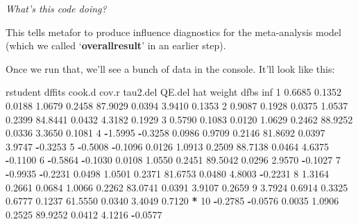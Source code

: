\documentclass[
]{book}
\newenvironment{Shaded}{\begin{snugshade}}{\end{snugshade}}
\newcommand{\DecValTok}[1]{\textcolor[rgb]{0.00,0.00,0.81}{#1}}
\newcommand{\FloatTok}[1]{\textcolor[rgb]{0.00,0.00,0.81}{#1}}
\newcommand{\NormalTok}[1]{#1}
\newcommand{\SpecialCharTok}[1]{\textcolor[rgb]{0.81,0.36,0.00}{\textbf{#1}}}
\begin{document}
\emph{What's this code doing?}

This tells metafor to produce influence diagnostics for the meta-analysis model (which we called `\textbf{overallresult}' in an earlier step).

Once we run that, we'll see a bunch of data in the console. It'll look like this:

\begin{Shaded}
\begin{Highlighting}[]
\NormalTok{  rstudent  dffits cook.d  cov.r tau2.del  QE.del    hat weight    dfbs inf }
\DecValTok{1}    \FloatTok{0.6685}  \FloatTok{0.1352} \FloatTok{0.0188} \FloatTok{1.0679}   \FloatTok{0.2458} \FloatTok{87.9029} \FloatTok{0.0394} \FloatTok{3.9410}  \FloatTok{0.1353}     
\DecValTok{2}    \FloatTok{0.9087}  \FloatTok{0.1928} \FloatTok{0.0375} \FloatTok{1.0537}   \FloatTok{0.2399} \FloatTok{84.8441} \FloatTok{0.0432} \FloatTok{4.3182}  \FloatTok{0.1929}     
\DecValTok{3}    \FloatTok{0.5790}  \FloatTok{0.1083} \FloatTok{0.0120} \FloatTok{1.0629}   \FloatTok{0.2462} \FloatTok{88.9252} \FloatTok{0.0336} \FloatTok{3.3650}  \FloatTok{0.1081}     
\DecValTok{4}   \SpecialCharTok{{-}}\FloatTok{1.5995} \SpecialCharTok{{-}}\FloatTok{0.3258} \FloatTok{0.0986} \FloatTok{0.9709}   \FloatTok{0.2146} \FloatTok{81.8692} \FloatTok{0.0397} \FloatTok{3.9747} \SpecialCharTok{{-}}\FloatTok{0.3253}     
\DecValTok{5}   \SpecialCharTok{{-}}\FloatTok{0.5008} \SpecialCharTok{{-}}\FloatTok{0.1096} \FloatTok{0.0126} \FloatTok{1.0913}   \FloatTok{0.2509} \FloatTok{88.7138} \FloatTok{0.0464} \FloatTok{4.6375} \SpecialCharTok{{-}}\FloatTok{0.1100}     
\DecValTok{6}   \SpecialCharTok{{-}}\FloatTok{0.5864} \SpecialCharTok{{-}}\FloatTok{0.1030} \FloatTok{0.0108} \FloatTok{1.0550}   \FloatTok{0.2451} \FloatTok{89.5042} \FloatTok{0.0296} \FloatTok{2.9570} \SpecialCharTok{{-}}\FloatTok{0.1027}     
\DecValTok{7}   \SpecialCharTok{{-}}\FloatTok{0.9935} \SpecialCharTok{{-}}\FloatTok{0.2231} \FloatTok{0.0498} \FloatTok{1.0501}   \FloatTok{0.2371} \FloatTok{81.6753} \FloatTok{0.0480} \FloatTok{4.8003} \SpecialCharTok{{-}}\FloatTok{0.2231}     
\DecValTok{8}    \FloatTok{1.3164}  \FloatTok{0.2661} \FloatTok{0.0684} \FloatTok{1.0066}   \FloatTok{0.2262} \FloatTok{83.0741} \FloatTok{0.0391} \FloatTok{3.9107}  \FloatTok{0.2659}     
\DecValTok{9}    \FloatTok{3.7924}  \FloatTok{0.6914} \FloatTok{0.3325} \FloatTok{0.6777}   \FloatTok{0.1237} \FloatTok{61.5550} \FloatTok{0.0340} \FloatTok{3.4049}  \FloatTok{0.7120}   \SpecialCharTok{*} 
\DecValTok{10}  \SpecialCharTok{{-}}\FloatTok{0.2785} \SpecialCharTok{{-}}\FloatTok{0.0576} \FloatTok{0.0035} \FloatTok{1.0906}   \FloatTok{0.2525} \FloatTok{89.9252} \FloatTok{0.0412} \FloatTok{4.1216} \SpecialCharTok{{-}}\FloatTok{0.0577}     

\end{Highlighting}
\end{Shaded}
\end{document}
